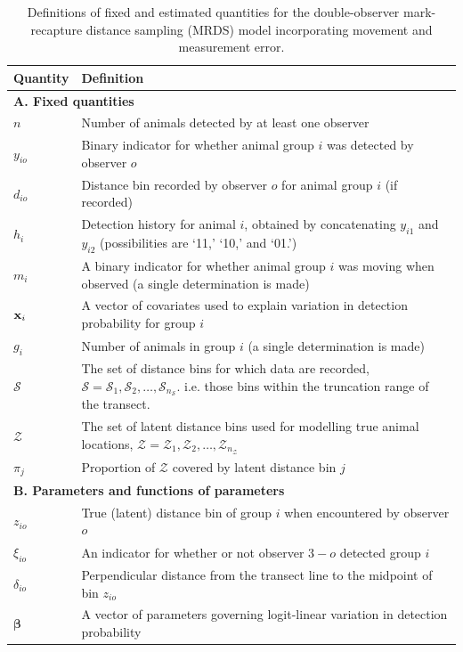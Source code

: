 \documentclass[aoas,preprint]{imsart}
\numberwithin{equation}{section}
\theoremstyle{plain}
\begin{document}
\begin{table}[ht]
\caption{Definitions of fixed and estimated quantities for the double-observer mark-recapture distance sampling (MRDS) model incorporating movement and measurement error.
}
\label{tab:notation}
\raggedright
\begin{tabular}{p{2cm}p{13cm}}
  \hline
   Quantity & Definition \\
  \hline
   \multicolumn{2}{l}{\textbf{A. Fixed quantities}}   \\
  $n$ & Number of animals detected by at least one observer \\
  $y_{io}$ & Binary indicator for whether animal group $i$ was detected by observer $o$\\
  $d_{io}$ & Distance bin recorded by observer $o$ for animal group $i$ (if recorded) \\
  $h_{i}$ & Detection history for animal $i$, obtained by concatenating $y_{i1}$ and $y_{i2}$ (possibilities are `11,' `10,' and `01.') \\
  $m_{i}$ & A binary indicator for whether animal group $i$ was moving when observed (a single determination is made) \\
  ${\bf x}_i$ & A vector of covariates used to explain variation in detection probability for group $i$ \\
  $g_i$ & Number of animals in group $i$ (a single determination is made) \\
  $\mathcal{S}$ & The set of distance bins for which data are recorded, $\mathcal{S}=\mathcal{S}_1,\mathcal{S}_2,\hdots,\mathcal{S}_{n_\mathcal{S}}$. i.e. those bins within the truncation range of the transect. \\
  $\mathcal{Z}$ & The set of latent distance bins used for modelling true animal locations, $\mathcal{Z}=\mathcal{Z}_1,\mathcal{Z}_2,\hdots,\mathcal{Z}_{n_\mathcal{Z}}$
  \\
  $\pi_j$ & Proportion of $\mathcal{Z}$ covered by latent distance bin $j$ \\
  \multicolumn{2}{l}{\textbf{B. Parameters and functions of parameters}} \\
  $z_{io}$ & True (latent) distance bin of group $i$ when encountered by observer $o$ \\
  $\xi_{io}$ & An indicator for whether or not observer $3-o$ detected group $i$ \\
  $\delta_{io}$ & Perpendicular distance from the transect line to the midpoint of bin $z_{io}$ \\
  $\boldsymbol{\beta}$ & A vector of parameters governing logit-linear variation in detection probability \\

\end{tabular}
\end{table}
\end{document}

